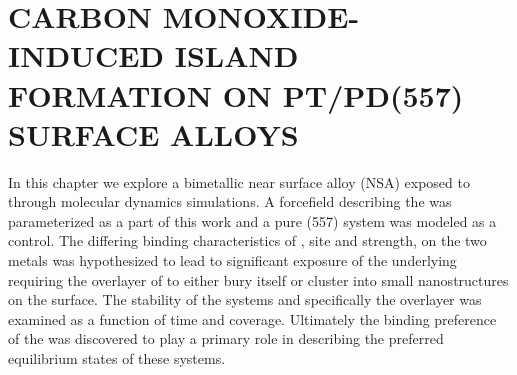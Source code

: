 \chapter{CARBON MONOXIDE-INDUCED ISLAND FORMATION ON PT/PD(557) SURFACE ALLOYS}
\label{chap:island}




In this chapter we explore a bimetallic  near surface alloy (NSA)
exposed to  through molecular dynamics simulations. A forcefield
describing the  was parameterized as a part of this work and
a pure  (557) system was modeled as a control. The differing binding
characteristics of , site and strength, on the two metals was
hypothesized to lead to significant exposure of the underlying 
requiring the overlayer of  to either bury itself or cluster into small
nanostructures on the surface. The stability of the systems and specifically
the  overlayer was examined as a function of time and  coverage.
Ultimately the binding preference of the  was discovered to play a
primary role in describing the preferred equilibrium states of these systems.



